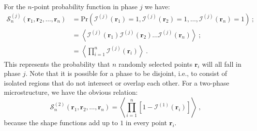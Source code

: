 For the $n$-point probability function in phase $j$ we have:
\begin{equation}
\begin{split}
	\mathcal{S}^{(j)}_n(\mathbf{r}_1,\mathbf{r}_2,\ldots,\mathbf{r}_n) & = \text{Pr}\left(\mathcal{I}^{(j)}(\mathbf{r}_1)=1,\mathcal{I}^{(j)}(\mathbf{r}_2)=1,\ldots,\mathcal{I}^{(j)}(\mathbf{r}_n)=1\right)\ ;\\ 
	& = \left\langle\mathcal{I}^{(j)}(\mathbf{r}_1)\mathcal{I}^{(j)}(\mathbf{r}_2)\ldots\mathcal{I}^{(j)}(\mathbf{r}_n)\right\rangle\ ;\label{\chabbr:eq:npoint}\\
	& = \left\langle\prod_{i=1}^n\mathcal{I}^{(j)}(\mathbf{r}_i)\right\rangle\ .	
\end{split}
\end{equation}
This represents the probability that $n$ randomly selected points $\mathbf{r}_i$ will all fall in phase $j$. Note that it is possible for a phase to be disjoint, i.e., to consist of isolated regions that do not intersect or overlap each other.  For a two-phase microstructure, we have the obvious relation:
\begin{equation}
	\mathcal{S}^{(2)}_n(\mathbf{r}_1,\mathbf{r}_2,\ldots,\mathbf{r}_n) = \left\langle\prod_{i=1}^n[1-\mathcal{I}^{(1)}(\mathbf{r}_i)]\right\rangle\ ,
\end{equation}
because the shape functions add up to $1$ in every point $\mathbf{r}_i$.

